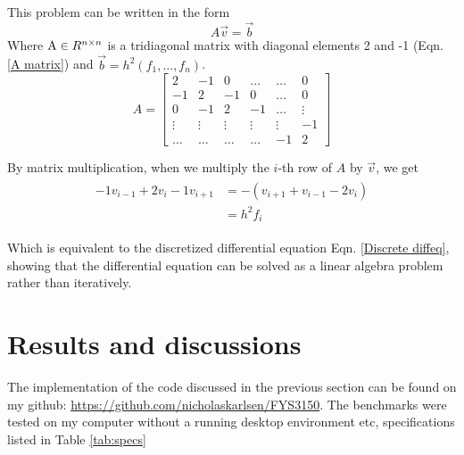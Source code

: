 \documentclass[10pt,showpacs,preprintnumbers,footinbib,amsmath,amssymb,aps,prl,twocolumn,groupedaddress,superscriptaddress,showkeys]{revtex4-1}
\begin{document}
  This problem can be written in the form 
  \begin{equation}
    A\vec v = \vec b
  \end{equation}
  Where $\textup A \in R^{n \times n}$ is a tridiagonal matrix with diagonal elements 2 and -1 (Eqn. \ref{A matrix}) and $\vec b =h^2(f_1, \dots, f_n)$.
  \begin{equation}
    \label{A matrix}
    A = \left[ 
    \begin{matrix}
      2 & -1 & 0 & \dots  & \dots &0 \\
      -1 & 2 & -1 & 0 & \dots &  0 \\
      0 & -1 & 2 & -1 & \dots & \vdots  \\
      \vdots & \vdots & \vdots & \vdots & \vdots & -1\\
      \dots & \dots & \dots & \dots & -1 & 2
    \end{matrix}
    \right]
  \end{equation}

  By matrix multiplication, when we multiply   the $i$-th row of $A$ by $\vec v$, we get
  \begin{align}
  \begin{split}
 -1 v_{i -1} + 2v_i - 1v_{i+1}  &= -\left( v_{i+1} + v_{i-1} - 2v_i\right) 
                                \\&= h^2f_i
  \end{split}
  \end{align}

  Which is equivalent to the discretized differential equation Eqn. \ref{Discrete diffeq},
  showing that the differential equation can be solved as a linear algebra problem rather than iteratively.


\section{Results and discussions}
  The implementation of the code discussed in the previous section can be found on my github: \url{https://github.com/nicholaskarlsen/FYS3150}. 
  The benchmarks were tested on my computer without a running desktop environment etc, specifications listed in Table \ref{tab:specs}
\end{document}
